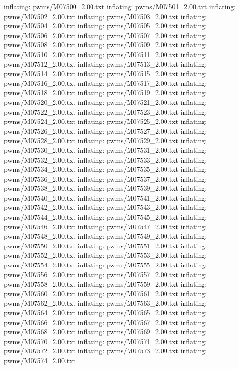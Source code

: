 \documentclass[letterpaper,10pt,english]{sphinxmanual}
\begin{document}
{\begin{sphinxVerbatim}[commandchars=\\\{\}]
  inflating: pwms/M07500\_2.00.txt
  inflating: pwms/M07501\_2.00.txt
  inflating: pwms/M07502\_2.00.txt
  inflating: pwms/M07503\_2.00.txt
  inflating: pwms/M07504\_2.00.txt
  inflating: pwms/M07505\_2.00.txt
  inflating: pwms/M07506\_2.00.txt
  inflating: pwms/M07507\_2.00.txt
  inflating: pwms/M07508\_2.00.txt
  inflating: pwms/M07509\_2.00.txt
  inflating: pwms/M07510\_2.00.txt
  inflating: pwms/M07511\_2.00.txt
  inflating: pwms/M07512\_2.00.txt
  inflating: pwms/M07513\_2.00.txt
  inflating: pwms/M07514\_2.00.txt
  inflating: pwms/M07515\_2.00.txt
  inflating: pwms/M07516\_2.00.txt
  inflating: pwms/M07517\_2.00.txt
  inflating: pwms/M07518\_2.00.txt
  inflating: pwms/M07519\_2.00.txt
  inflating: pwms/M07520\_2.00.txt
  inflating: pwms/M07521\_2.00.txt
  inflating: pwms/M07522\_2.00.txt
  inflating: pwms/M07523\_2.00.txt
  inflating: pwms/M07524\_2.00.txt
  inflating: pwms/M07525\_2.00.txt
  inflating: pwms/M07526\_2.00.txt
  inflating: pwms/M07527\_2.00.txt
  inflating: pwms/M07528\_2.00.txt
  inflating: pwms/M07529\_2.00.txt
  inflating: pwms/M07530\_2.00.txt
  inflating: pwms/M07531\_2.00.txt
  inflating: pwms/M07532\_2.00.txt
  inflating: pwms/M07533\_2.00.txt
  inflating: pwms/M07534\_2.00.txt
  inflating: pwms/M07535\_2.00.txt
  inflating: pwms/M07536\_2.00.txt
  inflating: pwms/M07537\_2.00.txt
  inflating: pwms/M07538\_2.00.txt
  inflating: pwms/M07539\_2.00.txt
  inflating: pwms/M07540\_2.00.txt
  inflating: pwms/M07541\_2.00.txt
  inflating: pwms/M07542\_2.00.txt
  inflating: pwms/M07543\_2.00.txt
  inflating: pwms/M07544\_2.00.txt
  inflating: pwms/M07545\_2.00.txt
  inflating: pwms/M07546\_2.00.txt
  inflating: pwms/M07547\_2.00.txt
  inflating: pwms/M07548\_2.00.txt
  inflating: pwms/M07549\_2.00.txt
  inflating: pwms/M07550\_2.00.txt
  inflating: pwms/M07551\_2.00.txt
  inflating: pwms/M07552\_2.00.txt
  inflating: pwms/M07553\_2.00.txt
  inflating: pwms/M07554\_2.00.txt
  inflating: pwms/M07555\_2.00.txt
  inflating: pwms/M07556\_2.00.txt
  inflating: pwms/M07557\_2.00.txt
  inflating: pwms/M07558\_2.00.txt
  inflating: pwms/M07559\_2.00.txt
  inflating: pwms/M07560\_2.00.txt
  inflating: pwms/M07561\_2.00.txt
  inflating: pwms/M07562\_2.00.txt
  inflating: pwms/M07563\_2.00.txt
  inflating: pwms/M07564\_2.00.txt
  inflating: pwms/M07565\_2.00.txt
  inflating: pwms/M07566\_2.00.txt
  inflating: pwms/M07567\_2.00.txt
  inflating: pwms/M07568\_2.00.txt
  inflating: pwms/M07569\_2.00.txt
  inflating: pwms/M07570\_2.00.txt
  inflating: pwms/M07571\_2.00.txt
  inflating: pwms/M07572\_2.00.txt
  inflating: pwms/M07573\_2.00.txt
  inflating: pwms/M07574\_2.00.txt

\end{sphinxVerbatim}}
\end{document}
